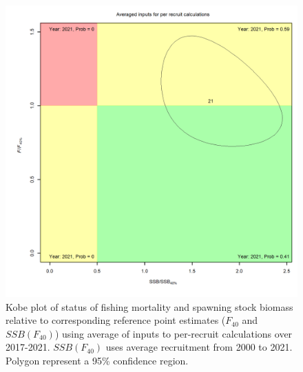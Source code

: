 \documentclass[
]{article}
\begin{document}
\begin{figure}

{\centering \includegraphics[width=1\linewidth]{../2023.RT.Runs/Run34/plots_png/ref_points/Kobe_status} 

}

\caption{Kobe plot of status of fishing mortality and spawning stock biomass relative to corresponding reference point estimates ($F_{40}$ and $SSB(F_{40})$) using average of inputs to per-recruit calculations over 2017-2021. $SSB(F_{40})$ uses average recruitment from 2000 to 2021. Polygon represent a 95\% confidence region.}\label{fig:kobe-status}
\end{figure}

\clearpage
\end{document}
